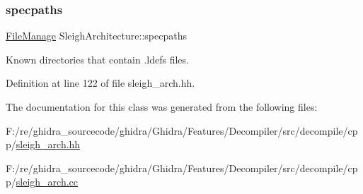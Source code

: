 \subsubsection{\texorpdfstring{specpaths}{specpaths}}
{\footnotesize\ttfamily \mbox{\hyperlink{class_file_manage}{File\+Manage}} Sleigh\+Architecture\+::specpaths\hspace{0.3cm}{\ttfamily [static]}}



Known directories that contain .ldefs files. 



Definition at line 122 of file sleigh\+\_\+arch.\+hh.



The documentation for this class was generated from the following files\+:\begin{DoxyCompactItemize}
\item 
F\+:/re/ghidra\+\_\+sourcecode/ghidra/\+Ghidra/\+Features/\+Decompiler/src/decompile/cpp/\mbox{\hyperlink{sleigh__arch_8hh}{sleigh\+\_\+arch.\+hh}}\item 
F\+:/re/ghidra\+\_\+sourcecode/ghidra/\+Ghidra/\+Features/\+Decompiler/src/decompile/cpp/\mbox{\hyperlink{sleigh__arch_8cc}{sleigh\+\_\+arch.\+cc}}\end{DoxyCompactItemize}
